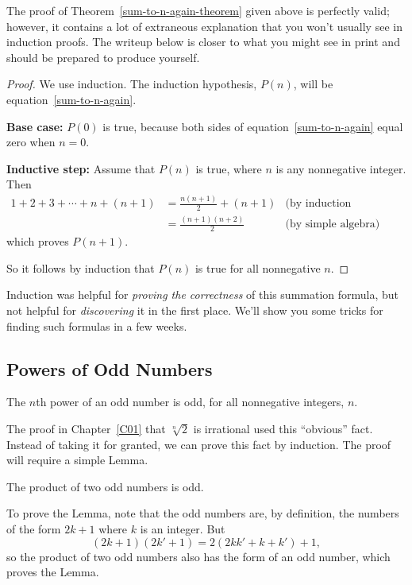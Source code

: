 The proof of Theorem~\ref{sum-to-n-again-theorem} given above is perfectly
valid; however, it contains a lot of extraneous explanation that you won't
usually see in induction proofs.  The writeup below is closer to what you
might see in print and should be prepared to produce yourself.

\begin{proof}
We use induction.  The induction hypothesis, $P(n)$, will be
equation~\eqref{sum-to-n-again}.

\textbf{Base case:} $P(0)$ is true, because both sides of
equation~\eqref{sum-to-n-again} equal zero when $n=0$.

\textbf{Inductive step:} Assume that $P(n)$ is true, where
$n$ is any nonnegative integer.  Then
\begin{align*}
1 + 2 + 3 + \cdots + n + (n+1)
    & = \frac{n(n+1)}{2} + (n+1) & \text{(by induction hypothesis)}\\
    & = \frac{(n+1)(n+2)}{2}  & \text{(by simple algebra)}
\end{align*}
which proves $P(n+1)$.

So it follows by induction that $P(n)$ is true for all nonnegative $n$.
\end{proof}

Induction was helpful for \textit{proving the correctness} of this
summation formula, but not helpful for \textit{discovering} it in the
first place.  We'll show you some tricks for finding such formulas in a
few weeks.

\iffalse
\subsection{Powers of Odd Numbers}

\begin{fact*}
The $n$th power of an odd number is odd, for all nonnegative integers, $n$.
\end{fact*}
The proof in Chapter~\ref{C01} that $\sqrt[n]{2}$ is irrational used this 
``obvious'' fact.  Instead of taking it for granted, we can prove this fact
by induction.
The proof will require a simple Lemma.
\begin{lemma*}
The product of two odd numbers is odd.
\end{lemma*}
To prove the Lemma, note that the odd numbers are, by definition, the
numbers of the form $2k+1$ where $k$ is an integer.  But
\[
(2k+1)(2k'+1) = 2(2kk' + k + k')+1,
\]
so the product of two odd numbers also has the form of an odd number,
which proves the Lemma.

